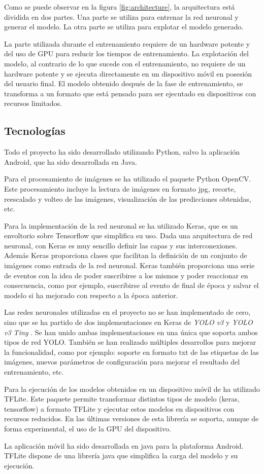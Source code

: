 Como se puede observar en la figura \ref{fig:architecture}, la arquitectura está dividida en dos partes. Una parte se utiliza para entrenar la red neuronal y generar el modelo. La otra parte se utiliza para explotar el modelo generado.

La parte utilizada durante el entrenamiento requiere de un hardware potente y del uso de GPU para reducir los tiempos de entrenamiento. La explotación del modelo, al contrario de lo que sucede con el entrenamiento, no requiere de un hardware potente y se ejecuta directamente en un dispositivo móvil en posesión del usuario final. El modelo obtenido después de la fase de entrenamiento, se transforma a un formato que está pensado para ser ejecutado en dispositivos con recursos limitados.

\subsection{Tecnologías}

Todo el proyecto ha sido desarrollado utilizando Python, salvo la aplicación Android, que ha sido desarrollada en Java.

Para el procesamiento de imágenes se ha utilizado el paquete Python OpenCV. Este procesamiento incluye la lectura de imágenes en formato jpg, recorte, reescalado y volteo de las imágenes, visualización de las predicciones obtenidas, etc.

Para la implementación de la red neuronal se ha utilizado Keras, que es un envoltorio sobre Tensorflow que simplifica su uso. Dada una arquitectura de red neuronal, con Keras es muy sencillo definir las capas y sus interconexiones. Además Keras proporciona clases que facilitan la definición de un conjunto de imágenes como entrada de la red neuronal. Keras también proporciona una serie de eventos con la idea de poder suscribirse a los mismos y poder reaccionar en consecuencia, como por ejemplo, suscribirse al evento de final de época y salvar el modelo si ha mejorado con respecto a la época anterior.

Las redes neuronales utilizadas en el proyecto no se han implementado de cero, sino que se ha partido de dos implementaciones en Keras de \textit{YOLO v3} \cite{s3_yolov3_orig} y \textit{YOLO v3 Tiny} \cite{s3_yolov3tiny_orig}. Se han unido ambas implementaciones en una única \cite{s3_yolo_dicastro} que soporta ambos tipos de red YOLO. También se han realizado múltiples desarrollos para mejorar la funcionalidad, como por ejemplo: soporte en formato txt de las etiquetas de las imágenes, nuevos parámetros de configuración para mejorar el resultado del entrenamiento, etc.

Para la ejecución de los modelos obtenidos en un dispositivo móvil de ha utilizado TFLite. Este paquete permite transformar distintos tipos de modelo (keras, tensorflow) a formato TFLite y ejecutar estos modelos en dispositivos con recursos reducidos. En las últimas versiones de esta librería se soporta, aunque de forma experimental, el uso de la GPU del dispositivo.

La aplicación móvil ha sido desarrollada en java para la plataforma Android. TFLite dispone de una librería java que simplifica la carga del modelo y su ejecución.